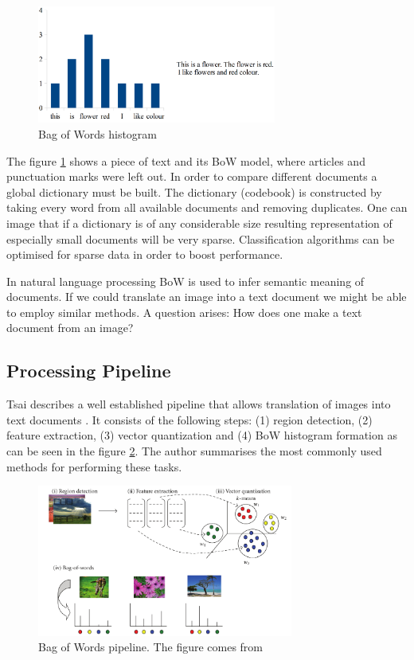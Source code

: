 	\begin{figure}[!ht]
	\centering
	\includegraphics[width=0.7\textwidth]{../figs/bow_example}
	\caption{Bag of Words histogram}
	\label{fig:bow_example}
	\end{figure}
	
	The figure \ref{fig:bow_example} shows a piece of text and its BoW model, where articles and punctuation marks were left out. In order to compare different documents a global dictionary must be built. The dictionary (codebook) is constructed by taking every word from all available documents and removing duplicates. One can image that if a dictionary is of any considerable size resulting representation of especially small documents will be very sparse. Classification algorithms can be optimised for sparse data in order to boost performance.

	In natural language processing BoW is used to infer semantic meaning of documents. If we could translate an image into a text document we might be able to employ similar methods. A question arises: How does one make a text document from an image?

	\subsection{Processing Pipeline}	
	Tsai describes a well established pipeline that allows translation of images into text documents \cite{tsai2012bag}. It consists of the following steps: (1) region detection, (2) feature extraction, (3) vector quantization and (4) BoW histogram formation as can be seen in the figure \ref{fig:bow_pipeline}. The author summarises the most commonly used methods for performing these tasks. 
	
	\begin{figure}[!ht]
	\centering
	\includegraphics[width=0.75\textwidth]{../figs/tsai2012}
	\caption{Bag of Words pipeline. The figure comes from \cite{tsai2012bag}}
	\label{fig:bow_pipeline}
	\end{figure}
	
